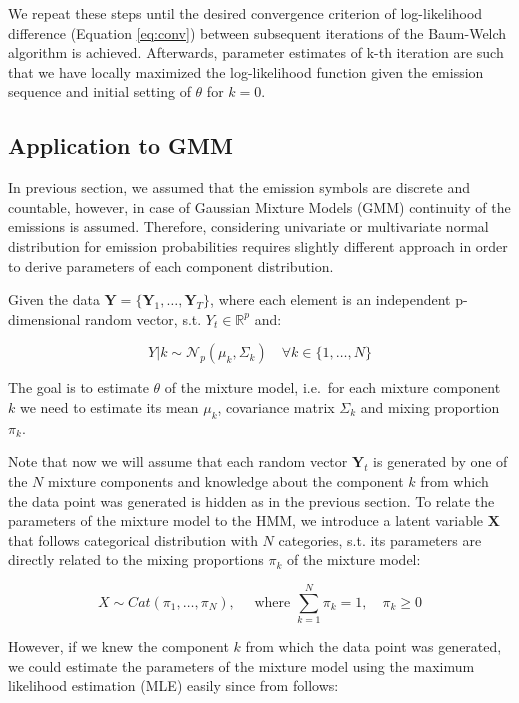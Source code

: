 We repeat these steps until the desired convergence criterion of log-likelihood difference (Equation \ref{eq:conv}) between subsequent iterations of the Baum-Welch algorithm 
is achieved. Afterwards, parameter estimates of k-th iteration are such that we have locally maximized the log-likelihood function given the emission sequence 
and initial setting of $\theta$ for $k=0$.

\subsection{Application to GMM}

In previous section, we assumed that the emission symbols are discrete and countable, however, in case of Gaussian Mixture Models (GMM) continuity of the emissions 
is assumed. Therefore, considering univariate or multivariate normal distribution for emission probabilities requires slightly different approach in order to derive parameters
 of each component distribution.

Given the data $\textbf{Y} = \{\textbf{Y}_1,\ldots,\textbf{Y}_T\}$, where each element is an independent  
p-dimensional random vector, s.t. $Y_t \in \mathbb{R}^p$ and:

\begin{equation}
    Y|k \sim \mathcal{N}_p(\mu_k, \Sigma_k) \quad \forall k \in \{1,\ldots,N\} 
\end{equation}

The goal is to estimate $\theta$ of the mixture model, i.e.\ for each mixture component $k$ we need to estimate its mean $\mu_k$, 
covariance matrix $\Sigma_k$ and mixing proportion $\pi_k$. \citep{Bishop2006} 

Note that now we will assume that each random vector $\textbf{Y}_t$ is generated by one of the $N$ mixture components and knowledge about the component $k$ from which the data point was generated is 
hidden as in the previous section. To relate the parameters of the mixture model to the HMM, we introduce a latent variable $\textbf{X}$ that follows categorical distribution with $N$ categories, s.t. 
its parameters are directly related to the mixing proportions $\pi_k$ of the mixture model:

\begin{equation}
    X \sim Cat(\pi_1,\ldots,\pi_N) , \quad \textrm{ where } \sum_{k=1}^{N} \pi_k = 1, \quad \pi_k \geq 0
\end{equation}

However, if we knew the component $k$ from which the data point was generated, we could estimate the parameters of the mixture model using the 
maximum likelihood estimation (MLE) easily since from \citep{Davenport1988} follows:

